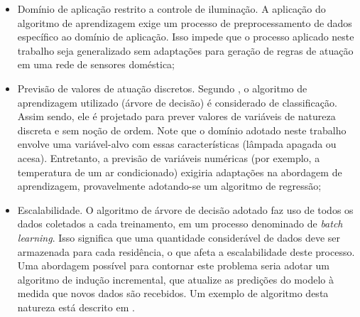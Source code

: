 \begin{itemize}
	\item Domínio de aplicação restrito a controle de iluminação. A aplicação do algoritmo de aprendizagem exige um processo de preprocessamento de dados específico ao domínio de aplicação. Isso impede que o processo aplicado neste trabalho seja generalizado sem adaptações para geração de regras de atuação em uma rede de sensores doméstica;
	\item Previsão de valores de atuação discretos. Segundo \cite{han2005}, o algoritmo de aprendizagem utilizado (árvore de decisão) é considerado de classificação. Assim sendo, ele é projetado para prever valores de variáveis de natureza discreta e sem noção de ordem. Note que o domínio adotado neste trabalho envolve uma variável-alvo com essas características (lâmpada apagada ou acesa). Entretanto, a previsão de variáveis numéricas (por exemplo, a temperatura de um ar condicionado) exigiria adaptações na abordagem de aprendizagem, provavelmente adotando-se um algoritmo de regressão;
	\item Escalabilidade. O algoritmo de árvore de decisão adotado faz uso de todos os dados coletados a cada treinamento, em um processo denominado de \textit{batch learning}. Isso significa que uma quantidade considerável de dados deve ser armazenada para cada residência, o que afeta a escalabilidade deste processo. Uma abordagem possível para contornar este problema seria adotar um algoritmo de indução incremental, que atualize as predições do modelo à medida que novos dados são recebidos. Um exemplo de algoritmo desta natureza está descrito em \cite{utgoff1989}.
\end{itemize}